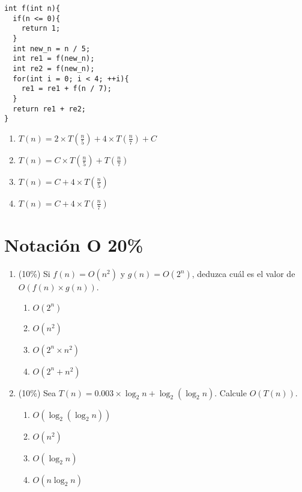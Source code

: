 \documentclass[10 pt]{article}
\begin{document}
\begin{multicols}{2}
\begin{enumerate}[label=(\alph*)]
\begin{lstlisting}
int f(int n){
  if(n <= 0){
    return 1;
  }
  int new_n = n / 5;
  int re1 = f(new_n);
  int re2 = f(new_n);
  for(int i = 0; i < 4; ++i){
    re1 = re1 + f(n / 7);
  }
  return re1 + re2;
}
\end{lstlisting}
\begin{enumerate}[label=(\roman*)]
\item $T(n) = 2 \times T(\frac{n}{5}) + 4 \times T(\frac{n}{7}) + C$
\item $T(n) = C \times T(\frac{n}{5}) + T(\frac{n}{7})$
\item $T(n) = C + 4 \times T(\frac{n}{5})$
\item $T(n) = C + 4 \times T(\frac{n}{7})$
\end{enumerate}
\end{enumerate}
\section{Notación O 20\%}
\begin{enumerate}[label=\alph*]
\item (10\%) Si $f(n) = O(n^2)$ y $g(n) = O(2^n)$, deduzca cuál es el valor de $O(f(n) \times g(n))$.
\begin{enumerate}[label=(\roman*)]
\item $O(2^n)$
\item $O(n^2)$
\item $O(2^n \times n^2)$
\item $O(2^n + n^2)$
\end{enumerate}

\item (10\%) Sea $T(n) = 0.003 \times \log_{2} n + \log_{2}(\log_{2} n)$. Calcule $O(T(n)).$
\begin{enumerate}[label=(\roman*)]
\item $O(\log_{2}(\log_{2} n))$
\item $O(n ^ 2)$
\item $O(\log_{2} n)$
\item $O(n \log_{2} n)$
\end{enumerate}
\end{enumerate}

\end{multicols}
\end{document}
